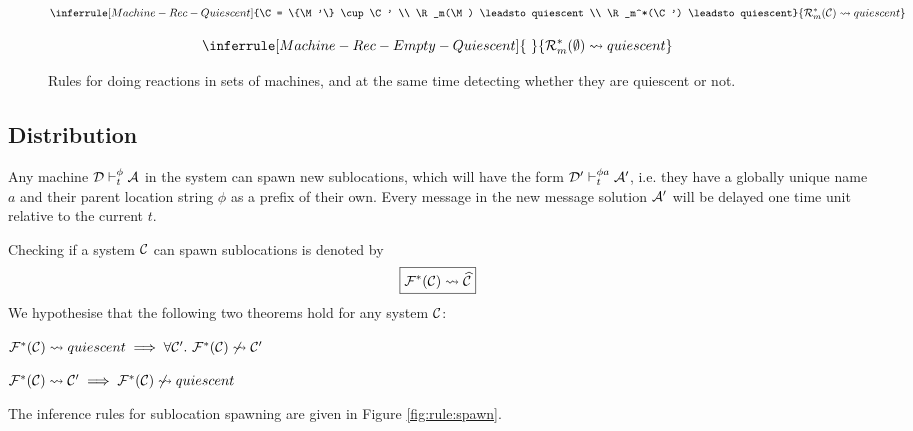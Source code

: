 \begin{figure}[!ht]
{\begin{minipage}{0.97\textwidth}
\begin{equation*}
\inferrule[Machine-Rec-Quiescent]
{\C = \{\M'\} \cup \C'
\\ \R_m(\M) \leadsto quiescent
\\ \R_m^*(\C') \leadsto quiescent}
{\R_m^*(\C) \leadsto quiescent}
\end{equation*}

\begin{equation*}
\inferrule[Machine-Rec-Empty-Quiescent]
{~}
{\R_m^*(\emptyset) \leadsto quiescent}
\end{equation*}

\end{minipage}}
\caption{Rules for doing reactions in sets of machines, and at the same time
detecting whether they are quiescent or not.\label{fig:rule:machine}}
\end{figure}


\subsection{Distribution}

Any machine $\mathcal{D} \vdash_t^\phi \mathcal{A}$ in the system can spawn new sublocations,
which will have the form $\mathcal{D}' \vdash_t^{\phi a} \mathcal{A}'$, i.e. they have a globally
unique name $a$ and their parent location string $\phi$ as a prefix of their
own. Every message in the new message solution $\mathcal{A}'$ will be delayed one time
unit relative to the current $t$.

Checking if a system $\mathcal{C}$ can spawn sublocations is denoted by
\begin{equation*}
\boxed{\mathcal{F}^*(\mathcal{C}) \leadsto \widehat{\mathcal{C}}}
\end{equation*}
We hypothesise that the following two theorems hold for any system $\mathcal{C}$:
\begin{theorem}
$\mathcal{F}^*(\mathcal{C}) \leadsto quiescent \implies \forall \mathcal{C}'.~ \mathcal{F}^*(\mathcal{C}) \not\leadsto \mathcal{C}'$
\end{theorem}
\begin{theorem}
$\mathcal{F}^*(\mathcal{C}) \leadsto \mathcal{C}' \implies \mathcal{F}^*(\mathcal{C}) \not\leadsto quiescent$
\end{theorem}
The inference rules for sublocation spawning are given in Figure
\ref{fig:rule:spawn}.

